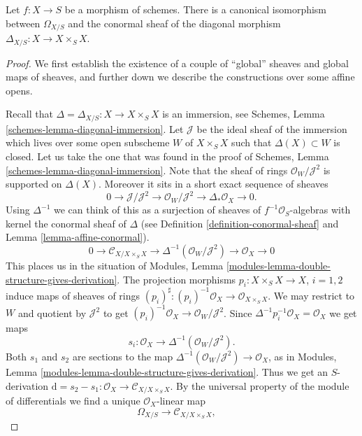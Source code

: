 \begin{lemma}
\label{lemma-differentials-diagonal}
Let $f : X \to S$ be a morphism of schemes. There is a canonical
isomorphism between $\Omega_{X/S}$ and the conormal sheaf of
the diagonal morphism $\Delta_{X/S} : X \longrightarrow X \times_S X$.
\end{lemma}

\begin{proof}
We first establish the existence of a couple of ``global'' sheaves
and global maps of sheaves, and further down we describe
the constructions over some affine opens.

\medskip\noindent
Recall that $\Delta = \Delta_{X/S} : X \to X \times_S X$
is an immersion, see Schemes, Lemma \ref{schemes-lemma-diagonal-immersion}.
Let $\mathcal{J}$ be the ideal sheaf of the immersion
which lives over some open subscheme $W$ of $X \times_S X$
such that $\Delta(X) \subset W$ is closed. Let us take the one that
was found in the proof of
Schemes, Lemma \ref{schemes-lemma-diagonal-immersion}.
Note that the sheaf of rings $\mathcal{O}_W/\mathcal{J}^2$
is supported on $\Delta(X)$. Moreover it sits in a
short exact sequence of sheaves
$$
0 \to \mathcal{J}/\mathcal{J}^2
\to \mathcal{O}_W/\mathcal{J}^2
\to \Delta_*\mathcal{O}_X
\to 0.
$$
Using $\Delta^{-1}$ we can think of this as a surjection of
sheaves of $f^{-1}\mathcal{O}_S$-algebras with kernel the
conormal sheaf of $\Delta$ (see Definition \ref{definition-conormal-sheaf}
and Lemma \ref{lemma-affine-conormal}).
$$
0 \to \mathcal{C}_{X/X \times_S X}
\to \Delta^{-1}(\mathcal{O}_W/\mathcal{J}^2)
\to \mathcal{O}_X
\to 0
$$
This places us in the situation of
Modules, Lemma \ref{modules-lemma-double-structure-gives-derivation}.
The projection morphisms $p_i : X \times_S X \to X$, $i = 1, 2$ induce
maps of sheaves of rings
$(p_i)^\sharp : (p_i)^{-1}\mathcal{O}_X \to \mathcal{O}_{X \times_S X}$.
We may restrict to $W$ and quotient by $\mathcal{J}^2$ to get
$(p_i)^{-1}\mathcal{O}_X \to \mathcal{O}_W/\mathcal{J}^2$.
Since $\Delta^{-1}p_i^{-1}\mathcal{O}_X = \mathcal{O}_X$
we get maps
$$
s_i : \mathcal{O}_X \to \Delta^{-1}(\mathcal{O}_W/\mathcal{J}^2).
$$
Both $s_1$ and $s_2$ are sections to the map
$\Delta^{-1}(\mathcal{O}_W/\mathcal{J}^2) \to \mathcal{O}_X$,
as in Modules, Lemma \ref{modules-lemma-double-structure-gives-derivation}.
Thus we get an $S$-derivation
$\text{d} = s_2 - s_1 : \mathcal{O}_X \to \mathcal{C}_{X/X \times_S X}$.
By the universal property of the module of differentials we find a
unique $\mathcal{O}_X$-linear map
$$
\Omega_{X/S} \longrightarrow \mathcal{C}_{X/X \times_S X},\quad
$$
\end{proof}
